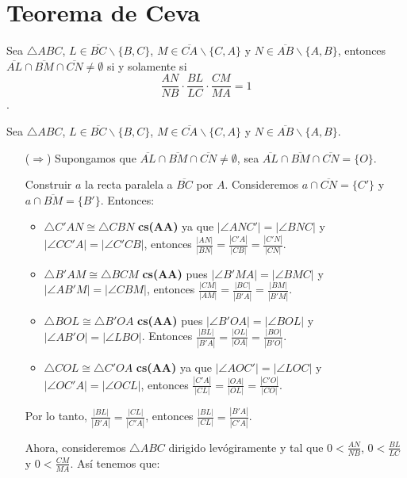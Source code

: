 \chapter{Teorema de Ceva}
\begin{teo}\label{Teo de Ceva}
Sea $\triangle ABC$, $L\in\overline{BC}\backslash \{B,C\}$, $M\in\overline{CA}\backslash \{C,A\}$ y $N\in\overline{AB}\backslash \{A,B\}$, entonces $\overline{AL}\cap\overline{BM}\cap\overline{CN}\neq\emptyset$ si y solamente si 
$$\frac{AN}{NB}\cdot\frac{BL}{LC}\cdot\frac{CM}{MA}=1$$.
\end{teo}

\begin{dem}
Sea $\triangle ABC$, $L\in\overline{BC}\backslash \{B,C\}$, $M\in\overline{CA}\backslash \{C,A\}$ y $N\in\overline{AB}\backslash \{A,B\}$.
\begin{enumerate}
\item[($\Rightarrow$)] Supongamos que $\overline{AL}\cap\overline{BM}\cap\overline{CN}\neq\emptyset$, sea $\overline{AL}\cap\overline{BM}\cap\overline{CN}=\{O\}$. 

Construir $a$ la recta paralela a $\overline{BC}$ por $A$. Consideremos $a\cap\overline{CN}=\{C'\}$ y $a\cap\overline{BM}=\{B'\}$. Entonces:

\begin{itemize}
\item $\triangle C'AN\cong\triangle CBN$ \textbf{cs(AA)} ya que $|\angle ANC'|=|\angle BNC|$ y $|\angle CC'A|=|\angle C'CB|$, entonces $\frac{|AN|}{|BN|}=\frac{|C'A|}{|CB|}=\frac{|C'N|}{|CN|}$.
\item $\triangle B'AM\cong\triangle BCM$ \textbf{cs(AA)} pues $|\angle B'MA|=|\angle BMC|$ y $|\angle AB'M|=|\angle CBM|$, entonces $\frac{|CM|}{|AM|}=\frac{|BC|}{|B'A|}=\frac{|BM|}{|B'M|}$.
\item $\triangle BOL\cong\triangle B'OA$ \textbf{cs(AA)} pues $|\angle B'OA|=|\angle BOL|$ y $|\angle AB'O|=|\angle LBO|$. Entonces $\frac{|BL|}{|B'A|}=\frac{|OL|}{|OA|}=\frac{|BO|}{|B'O|}$. 
\item $\triangle COL\cong\triangle C'OA$ \textbf{cs(AA)} ya que $|\angle AOC'|=|\angle LOC|$ y $|\angle OC'A|=|\angle OCL|$, entonces $\frac{|C'A|}{|CL|}=\frac{|OA|}{|OL|}=\frac{|C'O|}{|CO|}$.
\end{itemize}
Por lo tanto, 
$\frac{|BL|}{|B'A|}=\frac{|CL|}{|C'A|}$, entonces $\frac{|BL|}{|CL|}=\frac{|B'A|}{|C'A|}$.

Ahora, consideremos $\triangle ABC$ dirigido levógiramente y tal que $0<\frac{AN}{NB}$, $0<\frac{BL}{LC}$ y $0<\frac{CM}{MA}$. Así tenemos que:


\end{enumerate}
\end{dem}
